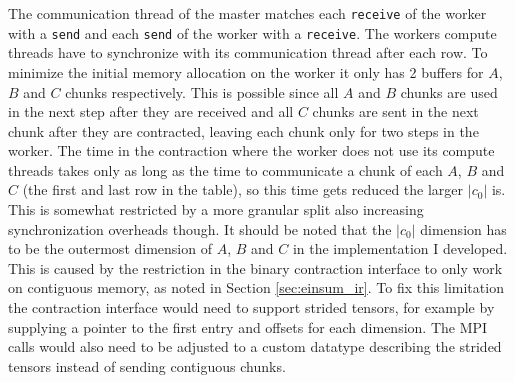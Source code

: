 The communication thread of the master matches each \texttt{receive} of the worker with a \texttt{send} and each \texttt{send} of the worker with a \texttt{receive}.
The workers compute threads have to synchronize with its communication thread after each row.
To minimize the initial memory allocation on the worker it only has 2 buffers for $A$, $B$ and $C$ chunks respectively.
This is possible since all $A$ and $B$ chunks are used in the next step after they are received and all $C$ chunks are sent in the next chunk after they are contracted, leaving each chunk only for two steps in the worker.
The time in the contraction where the worker does not use its compute threads takes only as long as the time to communicate a chunk of each $A$, $B$ and $C$ (the first and last row in the table), so this time gets reduced the larger $|c_0|$ is.
This is somewhat restricted by a more granular split also increasing synchronization overheads though.
It should be noted that the $|c_0|$ dimension has to be the outermost dimension of $A$, $B$ and $C$ in the implementation I developed.
This is caused by the restriction in the binary contraction interface to only work on contiguous memory, as noted in Section \ref{sec:einsum_ir}.
To fix this limitation the contraction interface would need to support strided tensors, for example by supplying a pointer to the first entry and offsets for each dimension.
The MPI calls would also need to be adjusted to a custom datatype describing the strided tensors instead of sending contiguous chunks.
